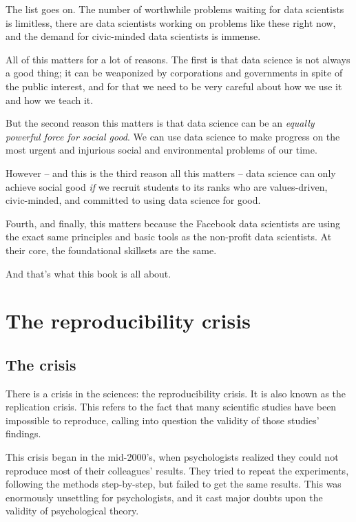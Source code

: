 \documentclass[]{book}
\begin{document}
The list goes on. The number of worthwhile problems waiting for data scientists is limitless, there are data scientists working on problems like these right now, and the demand for civic-minded data scientists is immense.

All of this matters for a lot of reasons. The first is that data science is not always a good thing; it can be weaponized by corporations and governments in spite of the public interest, and for that we need to be very careful about how we use it and how we teach it.

But the second reason this matters is that data science can be an \emph{equally powerful force for social good}. We can use data science to make progress on the most urgent and injurious social and environmental problems of our time.

However -- and this is the third reason all this matters -- data science can only achieve social good \emph{if} we recruit students to its ranks who are values-driven, civic-minded, and committed to using data science for good.

Fourth, and finally, this matters because the Facebook data scientists are using the exact same principles and basic tools as the non-profit data scientists. At their core, the foundational skillsets are the same.

And that's what this book is all about.

\hypertarget{the-reproducibility-crisis}{%
\chapter{The reproducibility crisis}\label{the-reproducibility-crisis}}

\hypertarget{the-crisis}{%
\section*{The crisis}\label{the-crisis}}

There is a crisis in the sciences: the reproducibility crisis. It is also known as the replication crisis. This refers to the fact that many scientific studies have been impossible to reproduce, calling into question the validity of those studies' findings.

This crisis began in the mid-2000's, when psychologists realized they could not reproduce most of their colleagues' results. They tried to repeat the experiments, following the methods step-by-step, but failed to get the same results. This was enormously unsettling for psychologists, and it cast major doubts upon the validity of psychological theory.
\end{document}
